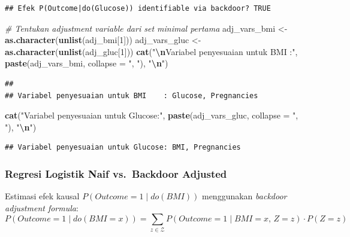 \documentclass[
  11pt,
]{article}
\newenvironment{Shaded}{\begin{snugshade}}{\end{snugshade}}
\newcommand{\AttributeTok}[1]{\textcolor[rgb]{0.13,0.29,0.53}{#1}}
\newcommand{\CommentTok}[1]{\textcolor[rgb]{0.56,0.35,0.01}{\textit{#1}}}
\newcommand{\DecValTok}[1]{\textcolor[rgb]{0.00,0.00,0.81}{#1}}
\newcommand{\FunctionTok}[1]{\textcolor[rgb]{0.13,0.29,0.53}{\textbf{#1}}}
\newcommand{\NormalTok}[1]{#1}
\newcommand{\OtherTok}[1]{\textcolor[rgb]{0.56,0.35,0.01}{#1}}
\newcommand{\SpecialCharTok}[1]{\textcolor[rgb]{0.81,0.36,0.00}{\textbf{#1}}}
\newcommand{\StringTok}[1]{\textcolor[rgb]{0.31,0.60,0.02}{#1}}
\begin{document}
\begin{verbatim}
## Efek P(Outcome|do(Glucose)) identifiable via backdoor? TRUE
\end{verbatim}

\begin{Shaded}
\begin{Highlighting}[]
\CommentTok{\# Tentukan adjustment variable dari set minimal pertama}
\NormalTok{adj\_vars\_bmi  }\OtherTok{\textless{}{-}} \FunctionTok{as.character}\NormalTok{(}\FunctionTok{unlist}\NormalTok{(adj\_bmi[}\DecValTok{1}\NormalTok{]))}
\NormalTok{adj\_vars\_gluc }\OtherTok{\textless{}{-}} \FunctionTok{as.character}\NormalTok{(}\FunctionTok{unlist}\NormalTok{(adj\_gluc[}\DecValTok{1}\NormalTok{]))}
\FunctionTok{cat}\NormalTok{(}\StringTok{"}\SpecialCharTok{\textbackslash{}n}\StringTok{Variabel penyesuaian untuk BMI    :"}\NormalTok{, }\FunctionTok{paste}\NormalTok{(adj\_vars\_bmi, }\AttributeTok{collapse =} \StringTok{", "}\NormalTok{), }\StringTok{"}\SpecialCharTok{\textbackslash{}n}\StringTok{"}\NormalTok{)}
\end{Highlighting}
\end{Shaded}

\begin{verbatim}
## 
## Variabel penyesuaian untuk BMI    : Glucose, Pregnancies
\end{verbatim}

\begin{Shaded}
\begin{Highlighting}[]
\FunctionTok{cat}\NormalTok{(}\StringTok{"Variabel penyesuaian untuk Glucose:"}\NormalTok{, }\FunctionTok{paste}\NormalTok{(adj\_vars\_gluc, }\AttributeTok{collapse =} \StringTok{", "}\NormalTok{), }\StringTok{"}\SpecialCharTok{\textbackslash{}n}\StringTok{"}\NormalTok{)}
\end{Highlighting}
\end{Shaded}

\begin{verbatim}
## Variabel penyesuaian untuk Glucose: BMI, Pregnancies
\end{verbatim}

\subsubsection{Regresi Logistik Naif vs.~Backdoor
Adjusted}\label{regresi-logistik-naif-vs.-backdoor-adjusted}

Estimasi efek kausal \(P(Outcome = 1 \mid do(BMI))\) menggunakan
\emph{backdoor adjustment formula}:
\[P(Outcome=1 \mid do(BMI=x)) = \sum_{z \in \mathcal{Z}} P(Outcome=1 \mid BMI=x,\, Z=z)\cdot P(Z=z)\]
\end{document}
